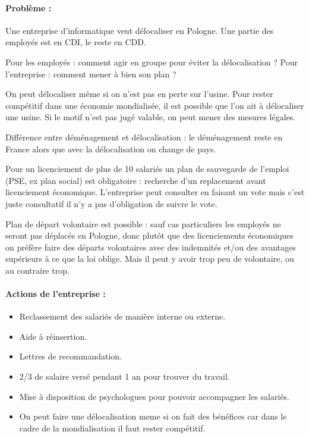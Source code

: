 \paragraph{Problème :}
Une entreprise d’informatique veut délocaliser en Pologne.
Une partie des employés est en CDI, le reste en CDD.

Pour les employés : comment agir en groupe pour éviter la délocalisation ?
Pour l'entreprise : comment mener à bien son plan ?

On peut délocaliser même si on n’est pas en perte sur l’usine. Pour rester compétitif dans une économie mondialisée, il est possible que l’on ait à délocaliser une usine.
Si le motif n’est pas jugé valable, on peut mener des mesures légales.

Différence entre déménagement et délocalisation : le déménagement reste en France alors que avec la délocalisation on change de pays.

Pour un licenciement de plus de 10 salariés un plan de sauvegarde de l'emploi (PSE, ex plan social) est obligatoire : recherche d'un replacement avant licenciement économique.
L’entreprise peut consulter en faisant un vote mais c'est juste consultatif il n'y a pas d'obligation de suivre le vote.

Plan de départ volontaire est possible : sauf cas particuliers les employés ne seront pas déplacés en Pologne, donc plutôt que des licenciements économiques on préfère faire des départs volontaires avec des indemnités et/ou des avantages supérieurs à ce que la loi oblige.
Mais il peut y avoir trop peu de volontaire, ou au contraire trop.

\paragraph{Actions de l'entreprise :}
	\begin{itemize}
	\item[\textbullet] Reclassement des salariés de manière interne ou externe.
	\item[\textbullet] Aide à réinsertion.
	\item[\textbullet] Lettres de recommandation.
	\item[\textbullet] 2/3 de salaire versé pendant 1 an pour trouver du travail.
	\item[\textbullet] Mise à disposition de psychologues pour pouvoir accompagner les salariés.
	\item[\textbullet] On peut faire une délocalisation meme si on fait des bénéfices car dans le cadre de la mondialisation il faut rester compétitif.
	\end{itemize}


